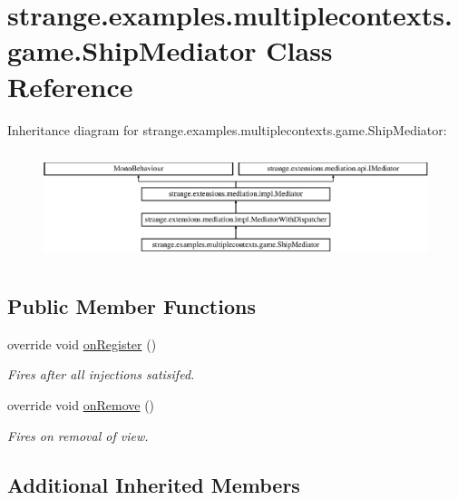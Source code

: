 \hypertarget{classstrange_1_1examples_1_1multiplecontexts_1_1game_1_1_ship_mediator}{\section{strange.\-examples.\-multiplecontexts.\-game.\-Ship\-Mediator Class Reference}
\label{classstrange_1_1examples_1_1multiplecontexts_1_1game_1_1_ship_mediator}
}
Inheritance diagram for strange.\-examples.\-multiplecontexts.\-game.\-Ship\-Mediator\-:\begin{figure}[H]
\begin{center}
\leavevmode
\includegraphics[height=3.227666cm]{classstrange_1_1examples_1_1multiplecontexts_1_1game_1_1_ship_mediator}
\end{center}
\end{figure}
\subsection*{Public Member Functions}
\begin{DoxyCompactItemize}
\item 
override void \hyperlink{classstrange_1_1examples_1_1multiplecontexts_1_1game_1_1_ship_mediator_a31b5b326b5259480d15ff3013bdf864c}{on\-Register} ()
\begin{DoxyCompactList}\small\item\em Fires after all injections satisifed. \end{DoxyCompactList}\item 
override void \hyperlink{classstrange_1_1examples_1_1multiplecontexts_1_1game_1_1_ship_mediator_a9c08a41320807a301303832db0166173}{on\-Remove} ()
\begin{DoxyCompactList}\small\item\em Fires on removal of view. \end{DoxyCompactList}\end{DoxyCompactItemize}
\subsection*{Additional Inherited Members}


